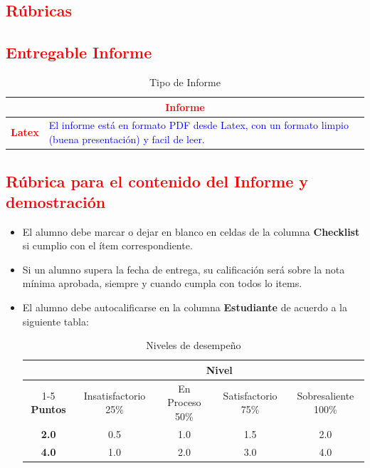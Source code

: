 \documentclass{article}
\begin{document}
\begin{itemize}
	\section{\textcolor{red}{Rúbricas}}
	
	\subsection{\textcolor{red}{Entregable Informe}}
	\begin{table}[H]
		\caption{Tipo de Informe}
		\setlength{\tabcolsep}{0.5em} %
		{\renewcommand{\arraystretch}{1.5}%
		
		\begin{tabular}{|p{3cm}|p{12cm}|}
			\hline
			\multicolumn{2}{|c|}{\textbf{\textcolor{red}{Informe}}}  \\
			\hline 
			\textbf{\textcolor{red}{Latex}} & \textcolor{blue}{El informe está en formato PDF desde Latex,  con un formato limpio (buena presentación) y facil de leer.}   \\ 
			\hline 
			
			
		\end{tabular}
	}
	\end{table}
	\subsection{\textcolor{red}{Rúbrica para el contenido del Informe y demostración}}
	\begin{itemize}			
		\item El alumno debe marcar o dejar en blanco en celdas de la columna \textbf{Checklist} si cumplio con el ítem correspondiente.
		\item Si un alumno supera la fecha de entrega,  su calificación será sobre la nota mínima aprobada, siempre y cuando cumpla con todos lo items.
		\item El alumno debe autocalificarse en la columna \textbf{Estudiante} de acuerdo a la siguiente tabla:
	
		\begin{table}[ht]
			\caption{Niveles de desempeño}
			\begin{center}
			\begin{tabular}{ccccc}
    			\hline
    			 & \multicolumn{4}{c}{Nivel}\\
    			\cline{1-5}
    			\textbf{Puntos} & Insatisfactorio 25\%& En Proceso 50\% & Satisfactorio 75\% & Sobresaliente 100\%\\
    			\textbf{2.0}&0.5&1.0&1.5&2.0\\
    			\textbf{4.0}&1.0&2.0&3.0&4.0\\
    		\hline
			\end{tabular}
		\end{center}
	\end{table}	
	

\end{itemize}
\end{itemize}
\end{document}
